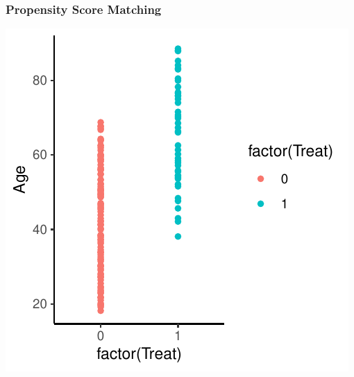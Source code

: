 \documentclass[xcolor=x11names,compress]{beamer}\usepackage[]{graphicx}\usepackage[]{color}
\makeatletter
\def\maxwidth{ %
  \ifdim\Gin@nat@width>\linewidth
    \linewidth
  \else
    \Gin@nat@width
  \fi
}
\newenvironment{knitrout}{}{} %
\renewcommand{\(}{\begin{columns}}
\renewcommand{\)}{\end{columns}}
\newcommand{\<}[1]{\begin{column}{#1}}
\renewcommand{\>}{\end{column}}
\makeatother
\begin{document}
\begin{frame}
\frametitle{Propensity Score Matching}
\begin{center}
\begin{knitrout}
\color{fgcolor}
\includegraphics[width=\maxwidth]{figure/pscore_matching_1-1} 

\end{knitrout}
\end{center}
\end{frame}
\end{document}
